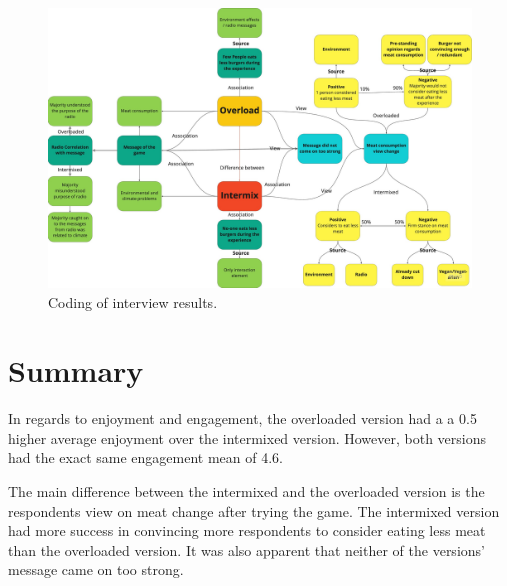         \begin{figure}[H]
        \centering
        \includegraphics[width=1\linewidth]{figure/Evaluation/eval.jpg}
        \caption{Coding of interview results.}
        \label{fig:EvalCoding}
    \end{figure}
    
\section{Summary}
In regards to enjoyment and engagement, the overloaded version had a a 0.5 higher average enjoyment over the intermixed version. However, both versions had the exact same engagement mean of 4.6.

The main difference between the intermixed and the overloaded version is the respondents view on meat change after trying the game. The intermixed version had more success in convincing more respondents to consider eating less meat than the overloaded version. It was also apparent that neither of the versions' message came on too strong. 